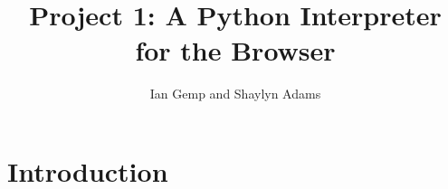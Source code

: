 \documentclass{article}
\begin{document}
\title{Project 1: A Python Interpreter for the Browser}
\author{Ian Gemp and Shaylyn Adams}
\maketitle

\section{Introduction}
\end{document}
